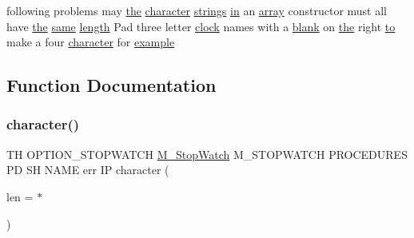 \begin{DoxyCompactItemize}
following problems may \hyperlink{M__stopwatch_83_8txt_a0f266597de2e57eb3aa964927bb30e14}{the} \hyperlink{option__stopwatch_83_8txt_abd4b21fbbd175834027b5224bfe97e66}{character} \hyperlink{M__stopwatch_83_8txt_aa711ac7da2d78a086c6bb85bf7aa4f9f}{strings} \hyperlink{M__journal_83_8txt_afce72651d1eed785a2132bee863b2f38}{in} an \hyperlink{intro__blas1_83_8txt_a89db1945e1a335ab0184c6a097821e32}{array} constructor must all have \hyperlink{M__stopwatch_83_8txt_a0f266597de2e57eb3aa964927bb30e14}{the} \hyperlink{__cmp_8f90_a099b4c5d750b7bb116895dc4fca1bf38}{same} \hyperlink{M__stopwatch_83_8txt_a04ed5ef37abacfa36a856b5f30376485}{length} Pad three letter \hyperlink{stop__watch_83_8txt_a148c035b430d6edf5413dbd2704facfb}{clock} names with a \hyperlink{M__stopwatch_83_8txt_ab1e613d54e5499697dd1189104a9f678}{blank} on \hyperlink{M__stopwatch_83_8txt_a0f266597de2e57eb3aa964927bb30e14}{the} right \hyperlink{M__stopwatch_83_8txt_a97209fd3e34ef701c0a9734280779cbb}{to} make a four \hyperlink{option__stopwatch_83_8txt_abd4b21fbbd175834027b5224bfe97e66}{character} for \hyperlink{option__stopwatch_83_8txt_a234fb06c9989676e2603991316e7ddc3}{example}
\end{DoxyCompactItemize}


\subsection{Function Documentation}
\mbox{\label{option__stopwatch_83_8txt_abd4b21fbbd175834027b5224bfe97e66}} 
\subsubsection{\texorpdfstring{character()}{character()}}
{\footnotesize\ttfamily TH O\+P\+T\+I\+O\+N\+\_\+\+S\+T\+O\+P\+W\+A\+T\+CH \hyperlink{option__stopwatch_83_8txt_aa2011fc45a5e502e87ee50996a8a9305}{M\+\_\+\+Stop\+Watch} M\+\_\+\+S\+T\+O\+P\+W\+A\+T\+CH P\+R\+O\+C\+E\+D\+U\+R\+ES PD SH N\+A\+ME err IP character (\begin{DoxyParamCaption}\item[{len}]{ = {\ttfamily $\ast$} }\end{DoxyParamCaption})}

\mbox{\label{option__stopwatch_83_8txt_ab7c1e89ebaceed2bc514366bd08ed26b}} 
